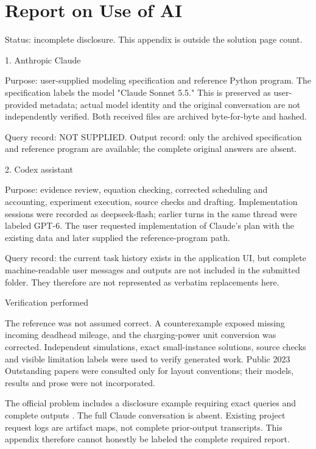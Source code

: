 \clearpage


\section*{Report on Use of AI}

Status: incomplete disclosure. This appendix is outside the solution page count.


1. Anthropic Claude


Purpose: user-supplied modeling specification and reference Python program. The specification labels the model "Claude Sonnet 5.5." This is preserved as user-provided metadata; actual model identity and the original conversation are not independently verified. Both received files are archived byte-for-byte and hashed.


Query record: NOT SUPPLIED. Output record: only the archived specification and reference program are available; the complete original answers are absent.


2. Codex assistant


Purpose: evidence review, equation checking, corrected scheduling and accounting, experiment execution, source checks and drafting. Implementation sessions were recorded as deepseek-flash; earlier turns in the same thread were labeled GPT-6. The user requested implementation of Claude's plan with the existing data and later supplied the reference-program path.


Query record: the current task history exists in the application UI, but complete machine-readable user messages and outputs are not included in the submitted folder. They therefore are not represented as verbatim replacements here.


Verification performed


The reference was not assumed correct. A counterexample exposed missing incoming deadhead mileage, and the charging-power unit conversion was corrected. Independent simulations, exact small-instance solutions, source checks and visible limitation labels were used to verify generated work. Public 2023 Outstanding papers were consulted only for layout conventions; their models, results and prose were not incorporated.


The official problem includes a disclosure example requiring exact queries and complete outputs \cite{ref1}. The full Claude conversation is absent. Existing project request logs are artifact maps, not complete prior-output transcripts. This appendix therefore cannot honestly be labeled the complete required report.


